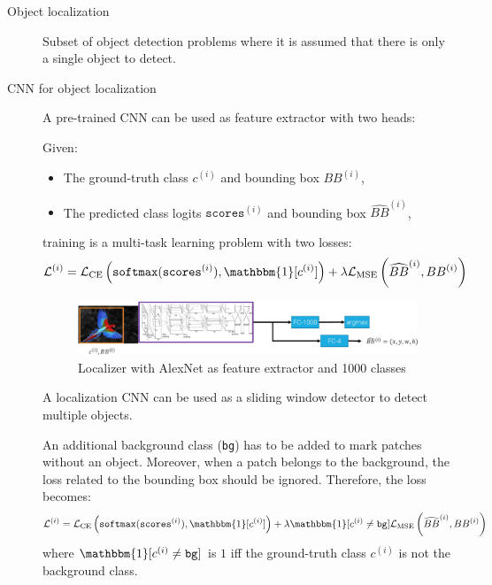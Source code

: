 \begin{description}
    \item[Object localization] 
        Subset of object detection problems where it is assumed that there is only a single object to detect.

    \item[CNN for object localization] 
        A pre-trained CNN can be used as feature extractor with two heads:

        Given:
        \begin{itemize}
            \item The ground-truth class $c^{(i)}$ and bounding box $BB^{(i)}$,
            \item The predicted class logits $\texttt{scores}^{(i)}$ and bounding box $\widehat{BB}^{(i)}$,
        \end{itemize} 
        training is a multi-task learning problem with two losses:
        \[ \mathcal{L}^{(i)} = \mathcal{L}_\text{CE}\left( \texttt{softmax}(\texttt{scores}^{(i)}), \mathbbm{1}[c^{(i)}] \right) + \lambda \mathcal{L}_\text{MSE}\left(\widehat{BB}^{(i)}, BB^{(i)} \right) \]

        \begin{figure}[H]
            \centering
            \includegraphics[width=0.9\linewidth]{./img/_cnn_object_localization.jpg}
            \caption{Localizer with AlexNet as feature extractor and 1000 classes}
        \end{figure}

        \begin{remark}
            A localization CNN can be used as a sliding window detector to detect multiple objects.

            An additional background class (\texttt{bg}) has to be added to mark patches without an object. Moreover, when a patch belongs to the background, the loss related to the bounding box should be ignored. Therefore, the loss becomes:
            \[ \mathcal{L}^{(i)} = \mathcal{L}_\text{CE}\left( \texttt{softmax}(\texttt{scores}^{(i)}), \mathbbm{1}[c^{(i)}] \right) + \lambda \mathbbm{1}[c^{(i)} \neq \texttt{bg}] \mathcal{L}_\text{MSE}\left(\widehat{BB}^{(i)}, BB^{(i)} \right) \]
            where $\mathbbm{1}[c^{(i)} \neq \texttt{bg}]$ is $1$ iff the ground-truth class $c^{(i)}$ is not the background class.


\end{remark}
\end{description}
